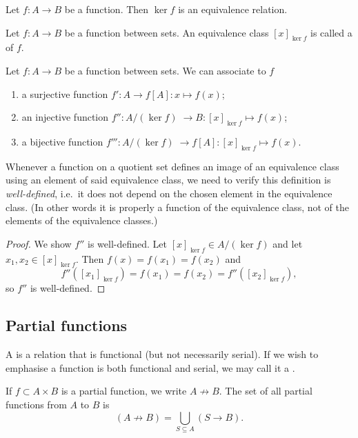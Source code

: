 \begin{lemma}
Let $f:A\to B$ be a function. Then $\ker f$ is an equivalence relation.
\end{lemma}

\begin{definition}
Let $f: A\to B$ be a function between sets. An equivalence class $[x]_{\ker f}$ is called a  of $f$.
\end{definition}

\begin{proposition}
Let $f:A\to B$ be a function between sets. We can associate to $f$
\begin{enumerate}
\item a surjective function $f': A\to f[A]: x\mapsto f(x)$;
\item an injective function $f'': A/(\ker f) \;\to B: [x]_{\ker f}\mapsto f(x)$;
\item a bijective function $f''': A/(\ker f) \;\to f[A]: [x]_{\ker f}\mapsto f(x)$.
\end{enumerate}
\end{proposition}
Whenever a function on a quotient set defines an image of an equivalence class using an element of said equivalence class, we need to verify this definition is \emph{well-defined}, i.e.\ it does not depend on the chosen element in the equivalence class. (In other words it is properly a function of the equivalence class, not of the elements of the equivalence classes.)
\begin{proof}
We show $f''$ is well-defined. Let $[x]_{\ker f}\in A/(\ker f)$ and let $x_1,x_2\in [x]_{\ker f}$. Then $f(x) = f(x_1) = f(x_2)$ and
\[ f''([x_1]_{\ker f}) = f(x_1) = f(x_2) = f''([x_2]_{\ker f}), \]
so $f''$ is well-defined.
\end{proof}





\subsection{Partial functions}
\begin{definition}
A  is a relation that is functional (but not necessarily serial). If we wish to emphasise a function is both functional and serial, we may call it a .
\end{definition}
If $f\subset A\times B$ is a partial function, we write $A\not \to B$. The set of all partial functions from $A$ to $B$ is
\[ (A\not \to B) = \bigcup _{S\subseteq A}(S\to B). \]

